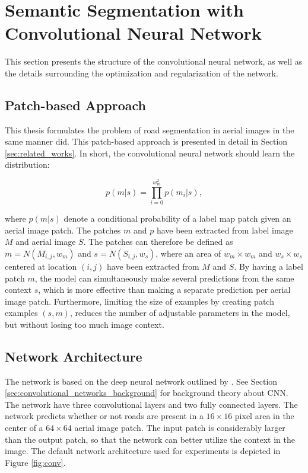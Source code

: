 \section{Semantic Segmentation with Convolutional Neural Network}
\label{sec:network}
This section presents the structure of the convolutional neural network, as well as the details surrounding the optimization and regularization of the network. 

\subsection{Patch-based Approach}
This thesis formulates the problem of road segmentation in aerial images in the same manner  \cite{Mnih_roads_high_res_aerial_images} did. This patch-based approach is presented in detail in Section \ref{sec:related_works}. In short, the convolutional neural network should learn the distribution:

$$ p(m|s) = \prod_{i=0}^{w_m^2}p(m_i | s),  $$

\noindent where $p(m|s)$ denote a conditional probability of a label map patch given an aerial image patch. The patches $m$ and $p$ have been extracted from label image $M$ and aerial image $S$. The patches can therefore be defined as $m =N(M_{i,j}, w_m)$ and $ s = N(S_{i,j}, w_s)$, where an area of $w_m \times w_m$ and $w_s \times w_s$ centered at location $(i, j)$ have been extracted from $M$ and $S$. By having a label patch $m$, the model can simultaneously make several predictions from the same context $s$, which is more effective than making a separate prediction per aerial image patch. Furthermore, limiting the size of examples by creating patch examples $(s, m)$, reduces the number of adjustable parameters in the model, but without losing too much image context.  \\ 


\subsection{Network Architecture}
The network is based on the deep neural network outlined by \cite{MnihThesis}. See Section \ref{sec:convolutional_networks_background} for background theory about \ac{CNN}. The network have three convolutional layers and two fully connected layers. The network predicts whether or not roads are present in a $16 \times 16$ pixel area in the center of  a $64 \times 64$ aerial image patch. The input patch is considerably larger than the output patch, so that the network can better utilize the context in the image. The default network architecture used for experiments is depicted in Figure \ref{fig:conv}. \\


